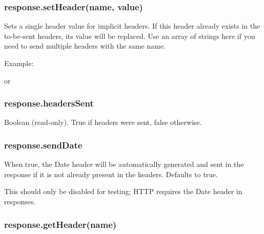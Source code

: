 \subsubsection{response.setHeader(name, value)}

Sets a single header value for implicit headers. If this header already
exists in the to-be-sent headers, its value will be replaced. Use an
array of strings here if you need to send multiple headers with the same
name.

Example:

\begin{Shaded}
\begin{Highlighting}[]
\NormalTok{(}\NormalTok{, }\NormalTok{);}
\end{Highlighting}
\end{Shaded}

or

\begin{Shaded}
\begin{Highlighting}[]
\NormalTok{(}\NormalTok{, [}\NormalTok{, }\NormalTok{]);}
\end{Highlighting}
\end{Shaded}

\subsubsection{response.headersSent}

Boolean (read-only). True if headers were sent, false otherwise.

\subsubsection{response.sendDate}

When true, the Date header will be automatically generated and sent in
the response if it is not already present in the headers. Defaults to
true.

This should only be disabled for testing; HTTP requires the Date header
in responses.

\subsubsection{response.getHeader(name)}

